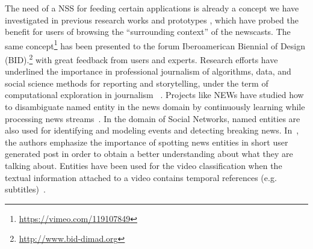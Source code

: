 \documentclass{llncs}
\begin{document}
The need of a NSS for feeding certain applications is already a concept we have investigated in previous research works and prototypes \cite{Redondo2014}, which have probed the benefit for users of browsing the ``surrounding context'' of the newscasts. The same concept\footnote{\url{https://vimeo.com/119107849}} has been presented to the forum Iberoamerican Biennial of Design (BID).\footnote{\url{http://www.bid-dimad.org}} with great feedback from users and experts.
Research efforts have underlined the importance in professional journalism of algorithms, data, and social science methods for reporting and storytelling, under the term of computational exploration in journalism ~\cite{gynnild2014}.  %
Projects like NEWs have studied how to disambiguate named entity in the news domain by continuously learning while processing news streams~\cite{Fernandez2012}. In the domain of Social Networks, named entities are also used for identifying and modeling events and detecting breaking news. In~\cite{Steiner2013}, the authors emphasize the importance of spotting news entities in short user generated post in order to obtain a better understanding about what they are talking about. Entities have been used for the video classification when the textual information attached to a video contains temporal references (e.g. subtitles)~\cite{yunjia2013}. 
\end{document}
